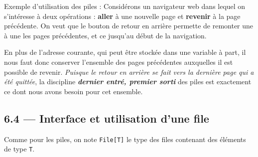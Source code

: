 \documentclass[a4paper,17pt]{extarticle}
\begin{document}
    Exemple d'utilisation des piles : Considérons un navigateur web dans
lequel on s'intéresse à deux opérations : \textbf{aller} à une nouvelle
page et \textbf{revenir} à la page précédente. On veut que le bouton de
retour en arrière permette de remonter une à une les pages précédentes,
et ce jusqu'au début de la navigation.

En plus de l'adresse courante, qui peut être stockée dans une variable à
part, il nous faut donc conserver l'ensemble des pages précédentes
auxquelles il est possible de revenir. \emph{Puisque le retour en
arrière se fait vers la dernière page qui a été quittée}, la discipline
\textbf{\emph{dernier entré, premier sorti}} des piles est exactement ce
dont nous avons besoin pour cet ensemble.

    \hypertarget{interface-et-utilisation-dune-file}{%
\subsection{6.4 --- Interface et utilisation d'une
file}\label{interface-et-utilisation-dune-file}}

    Comme pour les piles, on note \texttt{File{[}T{]}} le type des files
contenant des éléments de type \texttt{T}.
\end{document}
